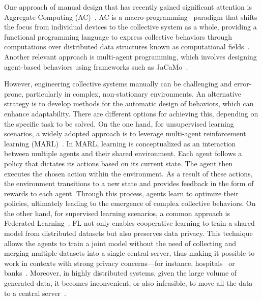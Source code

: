 \documentclass[12pt]{article}
\begin{document}
One approach of manual design that has recently gained significant attention is 
 Aggregate Computing (AC)~\cite{DBLP:journals/jlap/ViroliBDACP19}. 
% 
AC is a macro-programming~\cite{DBLP:journals/csur/Casadei23} paradigm that shifts the focus from individual 
 devices to the collective system as a whole, providing a functional programming language to express collective 
 behaviors through computations over distributed data structures 
 known as computational fields~\cite{DBLP:journals/pervasive/MameiZL04,DBLP:journals/jlap/ViroliBDACP19}. 
%
Another relevant approach is multi-agent programming, which involves designing agent-based behaviors 
 using frameworks such as JaCaMo~\cite{boissier2020multi}.

However, engineering collective systems manually can be challenging and error-prone, particularly in complex, 
 non-stationary environments. 
% 
An alternative strategy is to develop methods for the automatic design 
 of behaviors, which can enhance adaptability.
%
There are different options for achieving this, depending on the specific task to be solved. 
%
On the one hand, for unsupervised learning scenarios, a widely adopted approach is to leverage multi-agent 
 reinforcement learning (MARL)~\cite{DBLP:journals/corr/abs-1911-10635,DBLP:journals/tsmc/BusoniuBS08}. 
% 
In MARL, learning is conceptualized as an interaction between multiple agents and their shared environment. 
%
Each agent follows a policy that dictates its actions based on its current state. 
%
The agent then executes the chosen action within the environment. 
%
As a result of these actions, the environment transitions to a new state and provides feedback 
 in the form of rewards to each agent. 
% 
Through this process, agents learn to optimize their policies, ultimately leading to the 
 emergence of complex collective behaviors.
%
On the other hand, for supervised learning scenarios, a common approach is 
 Federated Learning~\cite{DBLP:conf/aistats/McMahanMRHA17}.
%
FL not only enables cooperative learning to train a shared model from distributed datasets
 but also preserves data privacy.
%
This technique allows the agents to train a joint model without the need of collecting and merging
 multiple datasets into a single central server, thus making it possible to work in contexts with strong 
 privacy concerns---for instance, hospitals~\cite{DBLP:journals/csur/NguyenPPDSLDH23} 
 or banks~\cite{DBLP:series/lncs/LongT0Z20}.
%
Moreover, in highly distributed systems, given the large volume of generated data, it becomes inconvenient, 
 or also infeasible, to move all the data to a central server~\cite{DBLP:journals/comsur/NguyenDPSLP21}.
\end{document}

